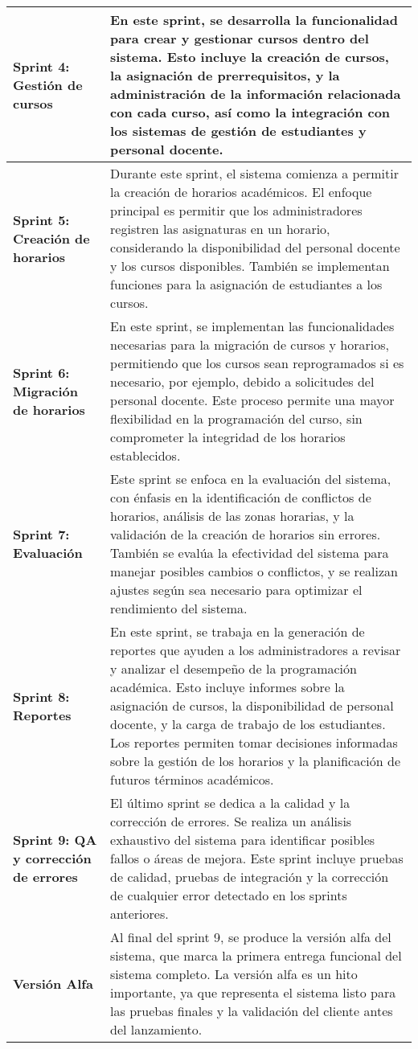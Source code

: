 \begin{longtable}{|p{3in}|p{3in}|}
\textbf{Sprint 4: Gestión de cursos} & 
En este sprint, se desarrolla la funcionalidad para crear y gestionar cursos dentro del sistema. Esto incluye la creación de cursos, la asignación de prerrequisitos, y la administración de la información relacionada con cada curso, así como la integración con los sistemas de gestión de estudiantes y personal docente. \\
\hline

\textbf{Sprint 5: Creación de horarios} & 
Durante este sprint, el sistema comienza a permitir la creación de horarios académicos. El enfoque principal es permitir que los administradores registren las asignaturas en un horario, considerando la disponibilidad del personal docente y los cursos disponibles. También se implementan funciones para la asignación de estudiantes a los cursos. \\
\hline

\textbf{Sprint 6: Migración de horarios} & 
En este sprint, se implementan las funcionalidades necesarias para la migración de cursos y horarios, permitiendo que los cursos sean reprogramados si es necesario, por ejemplo, debido a solicitudes del personal docente. Este proceso permite una mayor flexibilidad en la programación del curso, sin comprometer la integridad de los horarios establecidos. \\
\hline

\textbf{Sprint 7: Evaluación} & 
Este sprint se enfoca en la evaluación del sistema, con énfasis en la identificación de conflictos de horarios, análisis de las zonas horarias, y la validación de la creación de horarios sin errores. También se evalúa la efectividad del sistema para manejar posibles cambios o conflictos, y se realizan ajustes según sea necesario para optimizar el rendimiento del sistema. \\
\hline

\textbf{Sprint 8: Reportes} & 
En este sprint, se trabaja en la generación de reportes que ayuden a los administradores a revisar y analizar el desempeño de la programación académica. Esto incluye informes sobre la asignación de cursos, la disponibilidad de personal docente, y la carga de trabajo de los estudiantes. Los reportes permiten tomar decisiones informadas sobre la gestión de los horarios y la planificación de futuros términos académicos. \\
\hline

\textbf{Sprint 9: QA y corrección de errores} & 
El último sprint se dedica a la calidad y la corrección de errores. Se realiza un análisis exhaustivo del sistema para identificar posibles fallos o áreas de mejora. Este sprint incluye pruebas de calidad, pruebas de integración y la corrección de cualquier error detectado en los sprints anteriores. \\
\hline

\textbf{Versión Alfa} & 
Al final del sprint 9, se produce la versión alfa del sistema, que marca la primera entrega funcional del sistema completo. La versión alfa es un hito importante, ya que representa el sistema listo para las pruebas finales y la validación del cliente antes del lanzamiento. \\
\hline

\end{longtable}
